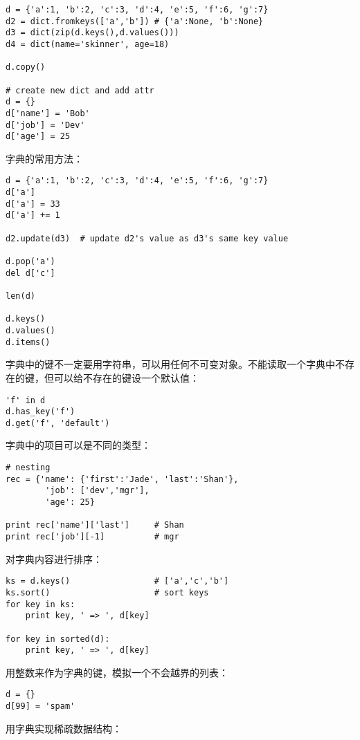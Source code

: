 \begin{lstlisting}
d = {'a':1, 'b':2, 'c':3, 'd':4, 'e':5, 'f':6, 'g':7}
d2 = dict.fromkeys(['a','b']) # {'a':None, 'b':None}
d3 = dict(zip(d.keys(),d.values()))
d4 = dict(name='skinner', age=18)

d.copy()

# create new dict and add attr
d = {}
d['name'] = 'Bob'
d['job'] = 'Dev'
d['age'] = 25
\end{lstlisting}

字典的常用方法：

\begin{lstlisting}
d = {'a':1, 'b':2, 'c':3, 'd':4, 'e':5, 'f':6, 'g':7}
d['a']
d['a'] = 33
d['a'] += 1

d2.update(d3)  # update d2's value as d3's same key value

d.pop('a')
del d['c']

len(d)

d.keys()
d.values()
d.items()
\end{lstlisting}

字典中的键不一定要用字符串，可以用任何不可变对象。不能读取一个字典中不存在的键，但可以给不存在的键设一个默认值：

\begin{lstlisting}
'f' in d
d.has_key('f')
d.get('f', 'default')
\end{lstlisting}

字典中的项目可以是不同的类型：

\begin{lstlisting}
# nesting
rec = {'name': {'first':'Jade', 'last':'Shan'},
		'job': ['dev','mgr'],
		'age': 25}

print rec['name']['last']     # Shan
print rec['job'][-1]          # mgr
\end{lstlisting}

对字典内容进行排序：

\begin{lstlisting}
ks = d.keys()                 # ['a','c','b']
ks.sort()                     # sort keys
for key in ks:
	print key, ' => ', d[key]

for key in sorted(d):
	print key, ' => ', d[key]
\end{lstlisting}

用整数来作为字典的键，模拟一个不会越界的列表：

\begin{lstlisting}
d = {}
d[99] = 'spam'
\end{lstlisting}

用字典实现稀疏数据结构：

